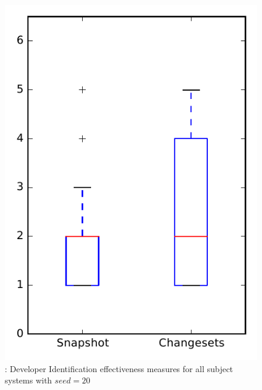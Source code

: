 
\begin{figure}
\centering
\includegraphics[height=0.4\textheight]{figures/dit_seed/rq1_overview_20}
\caption{\rtwo: Developer Identification effectiveness measures for all subject systems with $seed=20$}
\label{fig:dit_seed:rq1:overview}
\end{figure}
